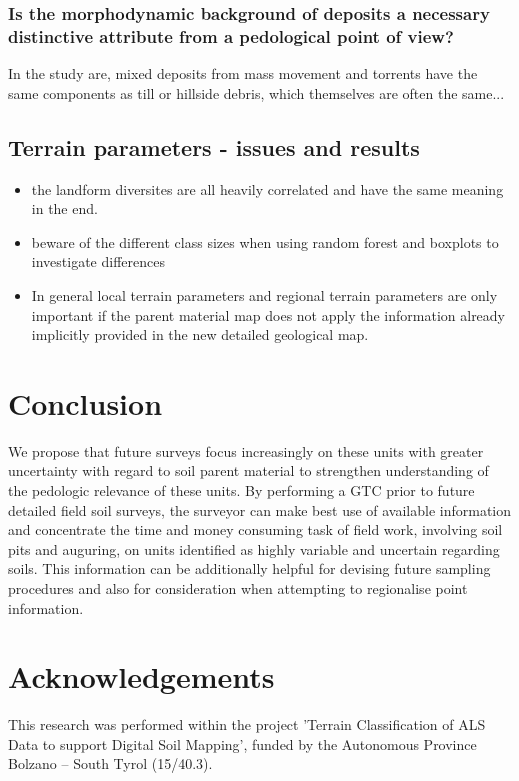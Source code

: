 \documentclass[preprint,12pt,authoryear]{elsarticle}
\begin{document}
\subsubsection{Is the morphodynamic background of deposits a necessary distinctive attribute from a pedological point of view?}
In the study are, mixed deposits from mass movement and torrents have the same components as till or hillside debris, which themselves are often the same...

\subsection{Terrain parameters - issues and results}
\begin{itemize}
\item the landform diversites are all heavily correlated and have the same meaning in the end.
\item beware of the different class sizes when using random forest and boxplots to investigate differences
\item In general local terrain parameters and regional terrain parameters are only important if the parent material map does not apply the information already implicitly provided in the new detailed geological map.
\end{itemize}

\section{Conclusion}
We propose that future surveys focus increasingly on these units with greater uncertainty with regard to soil parent material to strengthen understanding of the pedologic relevance of these units. By performing a GTC prior to future detailed field soil surveys, the surveyor can make best use of available information and concentrate the time and money consuming task of field work, involving soil pits and auguring, on units identified as highly variable and uncertain regarding soils. This information can be additionally helpful for devising future sampling procedures and also for consideration when attempting to regionalise point information.

\section*{Acknowledgements} This research was performed within the project 'Terrain Classification of ALS Data to support Digital Soil Mapping', funded by the Autonomous Province Bolzano -- South Tyrol (15/40.3).
\end{document}
